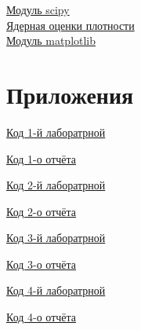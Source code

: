 \documentclass[a4]{article}
\begin{document}
	\href{https://www.scipy.org/}{Модуль scipy}\\
	
	\href{https://ru.wikipedia.org/wiki/%D0%AF%D0%B4%D0%B5%D1%80%D0%BD%D0%B0%D1%8F_%D0%BE%D1%86%D0%B5%D0%BD%D0%BA%D0%B0_%D0%BF%D0%BB%D0%BE%D1%82%D0%BD%D0%BE%D1%81%D1%82%D0%B8}{Ядерная оценки плотности}\\
		
	\href{https://matplotlib.org/}{Модуль matplotlib}\\
	
	\section{Приложения}
	
	\href{https://github.com/LuciusGen/Matstat/blob/master/Lab1/Lab1.py}{Код 1-й лаборатрной}
	
	\href{https://github.com/LuciusGen/Matstat/blob/master/Lab1/document.tex}{Код 1-о отчёта}
	
	\href{https://github.com/LuciusGen/Matstat/tree/master/Lab2/lab2.py}{Код 2-й лаборатрной}
	
	\href{https://github.com/LuciusGen/Matstat/tree/master/Lab2/document.tex}{Код 2-о отчёта}
	
	\href{https://github.com/LuciusGen/Matstat/blob/master/Lab3/lab3.py}{Код 3-й лаборатрной}
	
	\href{https://github.com/LuciusGen/Matstat/blob/master/Lab3/lab3.tex}{Код 3-о отчёта}
	
	\href{https://github.com/LuciusGen/Matstat/blob/master/Lab4/Lab4.py}{Код 4-й лаборатрной}
	
	\href{https://github.com/LuciusGen/Matstat/blob/master/Lab4/lab4.tex}{Код 4-о отчёта}
	
\end{document}
